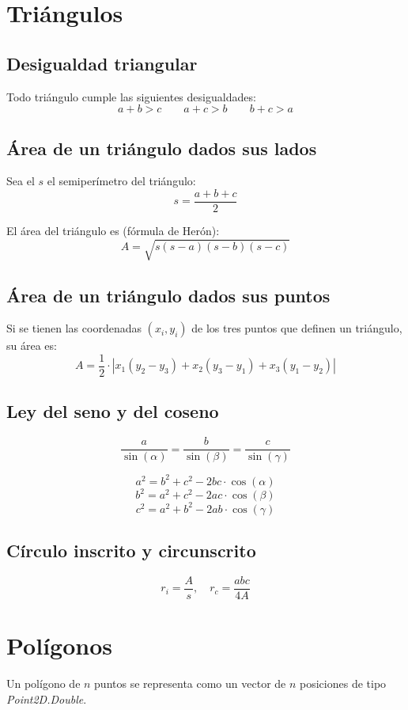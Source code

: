 \documentclass{article}
\begin{document}
\begin{multicols}{2}
\section{Triángulos}


\subsection{Desigualdad triangular}
Todo triángulo cumple las siguientes desigualdades:
\[ a+b > c \qquad a+c > b \qquad b+c>a \]

\subsection{Área de un triángulo dados sus lados}
Sea el \( s \) el semiperímetro del triángulo:
\[ s = \frac{a+b+c}{2} \]

El área del triángulo es (fórmula de Herón):
\[ A = \sqrt{s(s-a)(s-b)(s-c)} \]

\subsection{Área de un triángulo dados sus puntos}
Si se tienen las coordenadas \( (x_i, y_i) \) de los tres puntos que definen un triángulo, su área es:
\[ A = \frac{1}{2} \cdot | x_1(y_2-y_3) + x_2(y_3-y_1) + x_3(y_1-y_2) | \]

\subsection{Ley del seno y del coseno}
\[ \frac{a}{\sin(\alpha)} = \frac{b}{\sin(\beta)} = \frac{c}{\sin(\gamma)} \]

\[ a^2 = b^2 + c^2 - 2bc \cdot \cos(\alpha) \]
\[ b^2 = a^2 + c^2 - 2ac \cdot \cos(\beta) \]
\[ c^2 = a^2 + b^2 - 2ab \cdot \cos(\gamma) \]

\subsection{Círculo inscrito y circunscrito}
\[ r_i = \frac{A}{s}, \quad r_c = \frac{abc}{4A} \]


\section{Polígonos}
Un polígono de \( n \) puntos se representa como un vector de \( n \) posiciones de tipo \emph{Point2D.Double}.


\end{multicols}
\end{document}
